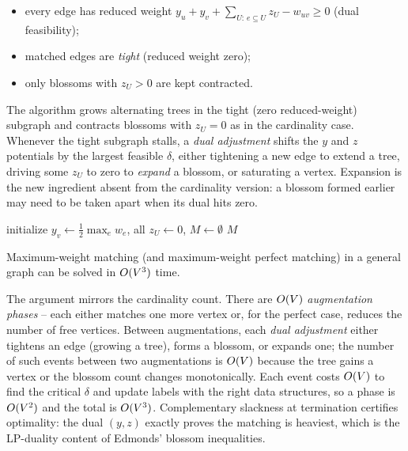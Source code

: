 \begin{itemize}
\item every edge has reduced weight $y_u+y_v+\sum_{U:\,e\subseteq U}z_U - w_{uv}\ge 0$ (dual
feasibility);
\item matched edges are \emph{tight} (reduced weight zero);
\item only blossoms with $z_U>0$ are kept contracted.
\end{itemize}

The algorithm grows alternating trees in the tight (zero reduced-weight) subgraph and contracts
blossoms with $z_U=0$ as in the cardinality case. Whenever the tight subgraph stalls, a \emph{dual
adjustment} shifts the $y$ and $z$ potentials by the largest feasible $\delta$, either tightening a new
edge to extend a tree, driving some $z_U$ to zero to \emph{expand} a blossom, or saturating a vertex.
Expansion is the new ingredient absent from the cardinality version: a
blossom formed earlier may need to be taken apart when its dual hits zero.

\begin{algorithm}[H]
\caption{\textsc{WeightedMatching} -- primal--dual skeleton (one phase)}
\label{ch17:alg-weighted}
\DontPrintSemicolon
initialize $y_v\gets \tfrac12\max_e w_e$, all $z_U\gets 0$, $M\gets\emptyset$\;
\Return $M$\;
\end{algorithm}

\begin{theorem}
\label{ch17:thm-weighted}
Maximum-weight matching (and maximum-weight perfect matching) in a general graph can be solved in
$O(V^3)$ time.
\end{theorem}

\begin{whybox}
The argument mirrors the cardinality count. There are $O(V)$ \emph{augmentation phases} -- each
either matches one more vertex or, for the perfect case, reduces the number of free vertices.
Between augmentations, each \emph{dual adjustment} either tightens an edge (growing a tree), forms a
blossom, or expands one; the number of such events between two augmentations is $O(V)$ because the
tree gains a vertex or the blossom count changes monotonically. Each event costs $O(V)$ to find the
critical $\delta$ and update labels with the right data structures, so a phase is $O(V^2)$ and the
total is $O(V^3)$. Complementary slackness at termination certifies optimality: the dual
$(y,z)$ exactly proves the matching is heaviest, which is the LP-duality content of Edmonds' blossom
inequalities.
\end{whybox}

